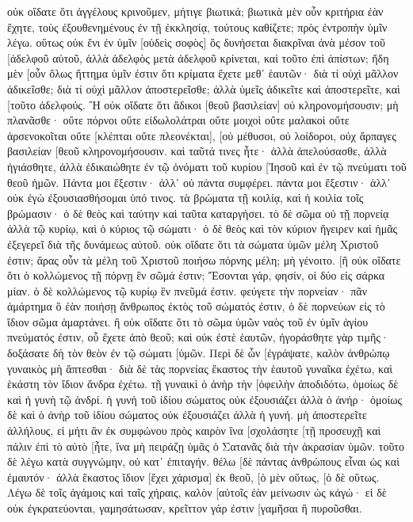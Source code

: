 οὐκ οἴδατε ὅτι ἀγγέλους κρινοῦμεν, μήτιγε βιωτικά; 
βιωτικὰ μὲν οὖν κριτήρια ἐὰν ἔχητε, τοὺς ἐξουθενημένους ἐν τῇ ἐκκλησίᾳ, τούτους καθίζετε; 
πρὸς ἐντροπὴν ὑμῖν λέγω. οὕτως οὐκ ἔνι ἐν ὑμῖν [οὐδεὶς σοφὸς] ὃς δυνήσεται διακρῖναι ἀνὰ μέσον τοῦ [ἀδελφοῦ αὐτοῦ, 
ἀλλὰ ἀδελφὸς μετὰ ἀδελφοῦ κρίνεται, καὶ τοῦτο ἐπὶ ἀπίστων; 
ἤδη μὲν [οὖν ὅλως ἥττημα ὑμῖν ἐστιν ὅτι κρίματα ἔχετε μεθ᾽ ἑαυτῶν· διὰ τί οὐχὶ μᾶλλον ἀδικεῖσθε; διὰ τί οὐχὶ μᾶλλον ἀποστερεῖσθε; 
ἀλλὰ ὑμεῖς ἀδικεῖτε καὶ ἀποστερεῖτε, καὶ [τοῦτο ἀδελφούς. 
Ἢ οὐκ οἴδατε ὅτι ἄδικοι [θεοῦ βασιλείαν] οὐ κληρονομήσουσιν; μὴ πλανᾶσθε· οὔτε πόρνοι οὔτε εἰδωλολάτραι οὔτε μοιχοὶ οὔτε μαλακοὶ οὔτε ἀρσενοκοῖται 
οὔτε [κλέπται οὔτε πλεονέκται], [οὐ μέθυσοι, οὐ λοίδοροι, οὐχ ἅρπαγες βασιλείαν [θεοῦ κληρονομήσουσιν. 
καὶ ταῦτά τινες ἦτε· ἀλλὰ ἀπελούσασθε, ἀλλὰ ἡγιάσθητε, ἀλλὰ ἐδικαιώθητε ἐν τῷ ὀνόματι τοῦ κυρίου [Ἰησοῦ καὶ ἐν τῷ πνεύματι τοῦ θεοῦ ἡμῶν. 
Πάντα μοι ἔξεστιν· ἀλλ᾽ οὐ πάντα συμφέρει. πάντα μοι ἔξεστιν· ἀλλ᾽ οὐκ ἐγὼ ἐξουσιασθήσομαι ὑπό τινος. 
τὰ βρώματα τῇ κοιλίᾳ, καὶ ἡ κοιλία τοῖς βρώμασιν· ὁ δὲ θεὸς καὶ ταύτην καὶ ταῦτα καταργήσει. τὸ δὲ σῶμα οὐ τῇ πορνείᾳ ἀλλὰ τῷ κυρίῳ, καὶ ὁ κύριος τῷ σώματι· 
ὁ δὲ θεὸς καὶ τὸν κύριον ἤγειρεν καὶ ἡμᾶς ἐξεγερεῖ διὰ τῆς δυνάμεως αὐτοῦ. 
οὐκ οἴδατε ὅτι τὰ σώματα ὑμῶν μέλη Χριστοῦ ἐστιν; ἄρας οὖν τὰ μέλη τοῦ Χριστοῦ ποιήσω πόρνης μέλη; μὴ γένοιτο. 
[ἢ οὐκ οἴδατε ὅτι ὁ κολλώμενος τῇ πόρνῃ ἓν σῶμά ἐστιν; Ἔσονται γάρ, φησίν, οἱ δύο εἰς σάρκα μίαν. 
ὁ δὲ κολλώμενος τῷ κυρίῳ ἓν πνεῦμά ἐστιν. 
φεύγετε τὴν πορνείαν· πᾶν ἁμάρτημα ὃ ἐὰν ποιήσῃ ἄνθρωπος ἐκτὸς τοῦ σώματός ἐστιν, ὁ δὲ πορνεύων εἰς τὸ ἴδιον σῶμα ἁμαρτάνει. 
ἢ οὐκ οἴδατε ὅτι τὸ σῶμα ὑμῶν ναὸς τοῦ ἐν ὑμῖν ἁγίου πνεύματός ἐστιν, οὗ ἔχετε ἀπὸ θεοῦ; καὶ οὐκ ἐστὲ ἑαυτῶν, 
ἠγοράσθητε γὰρ τιμῆς· δοξάσατε δὴ τὸν θεὸν ἐν τῷ σώματι [ὑμῶν. 
Περὶ δὲ ὧν [ἐγράψατε, καλὸν ἀνθρώπῳ γυναικὸς μὴ ἅπτεσθαι· 
διὰ δὲ τὰς πορνείας ἕκαστος τὴν ἑαυτοῦ γυναῖκα ἐχέτω, καὶ ἑκάστη τὸν ἴδιον ἄνδρα ἐχέτω. 
τῇ γυναικὶ ὁ ἀνὴρ τὴν [ὀφειλὴν ἀποδιδότω, ὁμοίως δὲ καὶ ἡ γυνὴ τῷ ἀνδρί. 
ἡ γυνὴ τοῦ ἰδίου σώματος οὐκ ἐξουσιάζει ἀλλὰ ὁ ἀνήρ· ὁμοίως δὲ καὶ ὁ ἀνὴρ τοῦ ἰδίου σώματος οὐκ ἐξουσιάζει ἀλλὰ ἡ γυνή. 
μὴ ἀποστερεῖτε ἀλλήλους, εἰ μήτι ἂν ἐκ συμφώνου πρὸς καιρὸν ἵνα [σχολάσητε [τῇ προσευχῇ καὶ πάλιν ἐπὶ τὸ αὐτὸ [ἦτε, ἵνα μὴ πειράζῃ ὑμᾶς ὁ Σατανᾶς διὰ τὴν ἀκρασίαν ὑμῶν. 
τοῦτο δὲ λέγω κατὰ συγγνώμην, οὐ κατ᾽ ἐπιταγήν. 
θέλω [δὲ πάντας ἀνθρώπους εἶναι ὡς καὶ ἐμαυτόν· ἀλλὰ ἕκαστος ἴδιον [ἔχει χάρισμα] ἐκ θεοῦ, [ὁ μὲν οὕτως, [ὁ δὲ οὕτως. 
Λέγω δὲ τοῖς ἀγάμοις καὶ ταῖς χήραις, καλὸν [αὐτοῖς ἐὰν μείνωσιν ὡς κἀγώ· 
εἰ δὲ οὐκ ἐγκρατεύονται, γαμησάτωσαν, κρεῖττον γάρ ἐστιν [γαμῆσαι ἢ πυροῦσθαι. 

